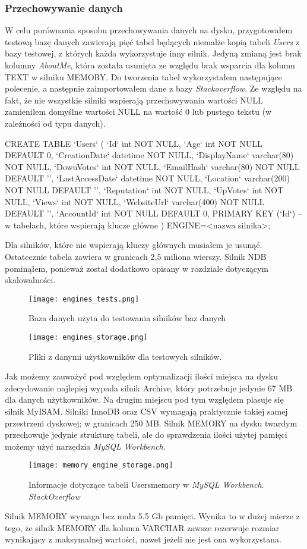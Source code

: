 \subsubsection{Przechowywanie danych}
W celu porównania sposobu przechowywania danych na dysku, przygotowałem testową bazę danych zawierają pięć tabel będących niemalże kopią tabeli \textit{Users} z bazy testowej, z których każda wykorzystuje inny silnik. Jedyną zmianą jest brak kolumny \textit{AboutMe}, która została usunięta ze względu brak wsparcia dla kolumn TEXT w silniku MEMORY. Do tworzenia tabel wykorzystałem następujące polecenie, a następnie zaimportowałem dane z bazy \textit{Stackoverflow}. Ze względu na fakt, że nie wszystkie silniki wspierają przechowywania wartości NULL zamieniłem domyślne wartości NULL na wartość 0 lub pustego tekstu (w zależności od typu danych).
\begin{spverbatim}
	CREATE TABLE `Users` (
	`Id` int NOT NULL,
	`Age` int NOT NULL DEFAULT 0,
	`CreationDate` datetime NOT NULL,
	`DisplayName` varchar(80) NOT NULL,
	`DownVotes` int NOT NULL,
	`EmailHash` varchar(80) NOT NULL DEFAULT '',
	`LastAccessDate` datetime NOT NULL,
	`Location` varchar(200) NOT NULL DEFAULT '',
	`Reputation` int NOT NULL,
	`UpVotes` int NOT NULL,
	`Views` int NOT NULL,
	`WebsiteUrl` varchar(400) NOT NULL DEFAULT '',
	`AccountId` int NOT NULL DEFAULT 0,
	PRIMARY KEY (`Id`) -- w tabelach, które wspierają klucze główne
	) ENGINE=<nazwa silnika>;
\end{spverbatim}
Dla silników, które nie wspierają kluczy głównych musiałem je usunąć. Ostatecznie tabela zawiera w granicach 2,5 miliona wierszy. Silnik NDB pominąłem, ponieważ został dodatkowo opisany w rozdziale dotyczącym skalowalności.
\begin{figure}[!h]
	\caption{Baza danych użyta do testowania silników baz danych}
	\centering
	\texttt{[image: engines\_tests.png]}
	\label{fig:label}
\end{figure}
\begin{figure}[!h]
	\caption{Pliki z danymi użytkowników dla testowych silników.}
	\centering
	\texttt{[image: engines\_storage.png]}
	\label{fig:label}
\end{figure}
Jak możemy zauważyć pod względem optymalizacji ilości miejsca na dysku zdecydowanie najlepiej wypada silnik Archive, który potrzebuje jedynie 67 MB dla danych użytkowników. Na drugim miejscu pod tym względem plasuje się silnik MyISAM. Silniki InnoDB oraz CSV wymagają praktycznie takiej samej przestrzeni dyskowej; w granicach 250 MB. Silnik MEMORY na dysku twardym przechowuje jedynie strukturę tabeli, ale do sprawdzenia ilości użytej pamięci możemy użyć narzędzia \textit{MySQL Workbench}.
\begin{figure}[!h]
	\caption{Informacje dotyczące tabeli Users\textunderscore memory w \textit{MySQL Workbench}. \textit{StackOverflow}}
	\centering
	\texttt{[image: memory\_engine\_storage.png]}
	\label{fig:label}
\end{figure}
Silnik MEMORY wymaga bez mała 5.5 Gb pamięci. Wynika to w dużej mierze z tego, że silnik MEMORY dla kolumn VARCHAR zawsze rezerwuje rozmiar wynikający z maksymalnej wartości, nawet jeżeli nie jest ona wykorzystana.




